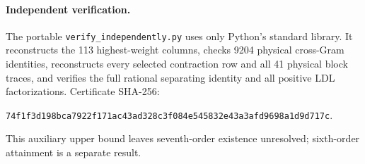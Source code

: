 \documentclass[11pt]{article}
\begin{document}
\paragraph{Independent verification.}
The portable \texttt{verify\_independently.py} uses only Python's standard library. It reconstructs the 113 highest-weight columns, checks 9204 physical cross-Gram identities, reconstructs every selected contraction row and all 41 physical block traces, and verifies the full rational separating identity and all positive LDL factorizations. Certificate SHA-256:
\begin{center}\small\texttt{74f1f3d198bca7922f171ac43ad328c3f084e545832e43a3afd9698a1d9d717c}.\end{center}
This auxiliary upper bound leaves seventh-order existence unresolved; sixth-order attainment is a separate result.
\end{document}
